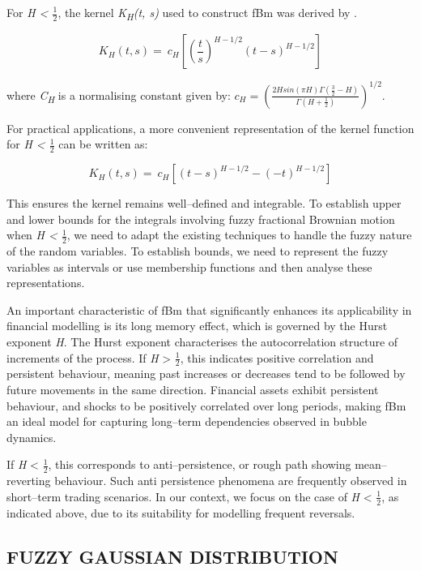 \documentclass[12pt,a4paper]{report}
\numberwithin{equation}{section}
\begin{document}
For \emph{H \textless{} $\frac{1}{2}$}, the kernel \emph{K\textsubscript{H}(t, s)}
used to construct fBm was derived by \cite{ness1968fractional_4}.

\[K_{H}(t,s) = \ c_{H}\left\lbrack \left( \frac{t}{s} \right)^{H - 1/2}{(t - s)}^{H - 1/2} \right\rbrack\]

where \emph{C\textsubscript{H}} is a normalising constant given by:
\(c_{H} = \left( \frac{2Hsin(\pi H)\Gamma(\frac{3}{2} - H)}{\Gamma(H + \frac{1}{2})} \right)^{1/2}.\)

For practical applications, a more convenient representation of the
kernel function for \emph{H \textless{} $\frac{1}{2}$} can be written as:

\[K_{H}(t,s) = \ c_{H}\left\lbrack (t - s)^{H - 1/2} - {( - t)}^{H - 1/2} \right\rbrack\]

This ensures the kernel remains well--defined and integrable. To
establish upper and lower bounds for the integrals involving fuzzy
fractional Brownian motion when \emph{H \textless{} $\frac{1}{2}$}, we need to adapt
the existing techniques to handle the fuzzy nature of the random
variables. To establish bounds, we need to represent the fuzzy variables
as intervals or use membership functions and then analyse these
representations.

An important characteristic of fBm that significantly enhances its
applicability in financial modelling is its long memory effect, which is
governed by the Hurst exponent \emph{H}. The Hurst exponent
characterises the autocorrelation structure of increments of the
process. If \emph{H} \textgreater{} $\frac{1}{2}$, this indicates positive
correlation and persistent behaviour, meaning past increases or
decreases tend to be followed by future movements in the same direction.
Financial assets exhibit persistent behaviour, and shocks to be
positively correlated over long periods, making fBm an ideal model for
capturing long--term dependencies observed in bubble dynamics.

If \emph{H} \textless{} $\frac{1}{2}$, this corresponds to anti--persistence, or
rough path showing mean--reverting behaviour. Such anti persistence
phenomena are frequently observed in short--term trading scenarios. In
our context, we focus on the case of \emph{H} \textless{} $\frac{1}{2}$, as
indicated above, due to its suitability for modelling frequent
reversals.

\hypertarget{fuzzy--gaussian--distribution}{%
\subsection{FUZZY GAUSSIAN
DISTRIBUTION}\label{fuzzy--gaussian--distribution}}
\end{document}
